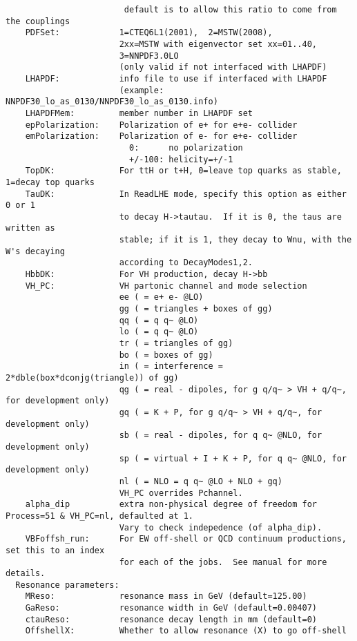 \documentclass[aps,superscriptaddress,nofootinbib]{revtex4}
\begin{document}
\begin{verbatim}
                        default is to allow this ratio to come from the couplings
    PDFSet:            1=CTEQ6L1(2001),  2=MSTW(2008),
                       2xx=MSTW with eigenvector set xx=01..40,
                       3=NNPDF3.0LO
                       (only valid if not interfaced with LHAPDF)
    LHAPDF:            info file to use if interfaced with LHAPDF
                       (example: NNPDF30_lo_as_0130/NNPDF30_lo_as_0130.info)
    LHAPDFMem:         member number in LHAPDF set
    epPolarization:    Polarization of e+ for e+e- collider
    emPolarization:    Polarization of e- for e+e- collider
                         0:      no polarization
                         +/-100: helicity=+/-1
    TopDK:             For ttH or t+H, 0=leave top quarks as stable, 1=decay top quarks
    TauDK:             In ReadLHE mode, specify this option as either 0 or 1
                       to decay H->tautau.  If it is 0, the taus are written as
                       stable; if it is 1, they decay to Wnu, with the W's decaying
                       according to DecayModes1,2.
    HbbDK:             For VH production, decay H->bb
    VH_PC:             VH partonic channel and mode selection
                       ee ( = e+ e- @LO)
                       gg ( = triangles + boxes of gg)
                       qq ( = q q~ @LO)
                       lo ( = q q~ @LO)
                       tr ( = triangles of gg)
                       bo ( = boxes of gg)
                       in ( = interference = 2*dble(box*dconjg(triangle)) of gg)
                       qg ( = real - dipoles, for g q/q~ > VH + q/q~, for development only)
                       gq ( = K + P, for g q/q~ > VH + q/q~, for development only)
                       sb ( = real - dipoles, for q q~ @NLO, for development only)
                       sp ( = virtual + I + K + P, for q q~ @NLO, for development only)
                       nl ( = NLO = q q~ @LO + NLO + gq)
                       VH_PC overrides Pchannel.
    alpha_dip          extra non-physical degree of freedom for Process=51 & VH_PC=nl, defaulted at 1.
                       Vary to check indepedence (of alpha_dip).
    VBFoffsh_run:      For EW off-shell or QCD continuum productions, set this to an index
                       for each of the jobs.  See manual for more details.
  Resonance parameters:
    MReso:             resonance mass in GeV (default=125.00)
    GaReso:            resonance width in GeV (default=0.00407)
    ctauReso:          resonance decay length in mm (default=0)
    OffshellX:         Whether to allow resonance (X) to go off-shell

\end{verbatim}
\end{document}
